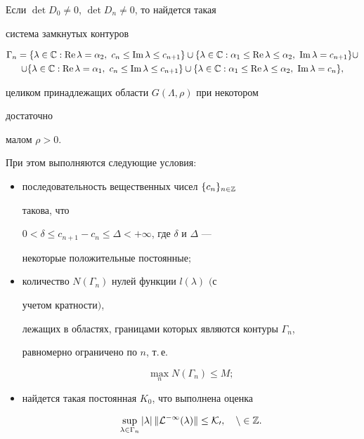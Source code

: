 \begin{lem} 


Если $\det D_0\ne0$, $\det D_n\ne0$, то найдется такая 


система замкнутых контуров 


\begin{multline*} 


\Gamma_n=\{\lambda\in\Bbb C:\re\lambda=\alpha_2,\ c_n\le\im\lambda\le 


c_{n+1}\}\cup\{\lambda\in\Bbb C:\alpha_1\le\re\lambda\le\alpha_2, 


\ \im\lambda=c_{n+1}\}\cup \\ 


% 


\cup\{\lambda\in\Bbb C:\re\lambda=\alpha_1, 


\ c_n\le\im\lambda\le c_{n+1}\}\cup 


\{\lambda\in\Bbb C:\alpha_1\le\re\lambda\le\alpha_2, 


\ \im\lambda=c_n\}, 


\end{multline*} 


целиком принадлежащих области $G(\Lambda,\rho)$ при некотором 


достаточно 


малом $\rho>0$. 


При этом выполняются следующие условия$:$ 


\begin{itemize} 


\item[(i)] последовательность вещественных чисел $\{c_n\}_{n\in\Bbb Z}$ 


такова, что 


$0<\delta\le c_{n+1}-c_n\le\Delta<+\infty$, где $\delta$ и $\Delta$ --- 


некоторые положительные постоянные$;$ 


\item[(ii)] количество $N(\Gamma_n)$ нулей функции $l(\lambda)$ $($с 


учетом кратности$)$, 


лежащих в областях, границами которых являются контуры $\Gamma_n$, 


равномерно ограничено по $n$, т.\,е. 


$$ 


\max_n N(\Gamma_n)\le M; 


$$ 


\item[(iii)] найдется такая постоянная $K_0$, что выполнена оценка 


$$ 


\sup_{\lambda\in\Gamma_n}|\lambda|\,\|\cal L^{-1}(\lambda)\| 


\le K_0,\quad n\in\Bbb Z. 


$$ 


\end{itemize} 


\end{lem} 


